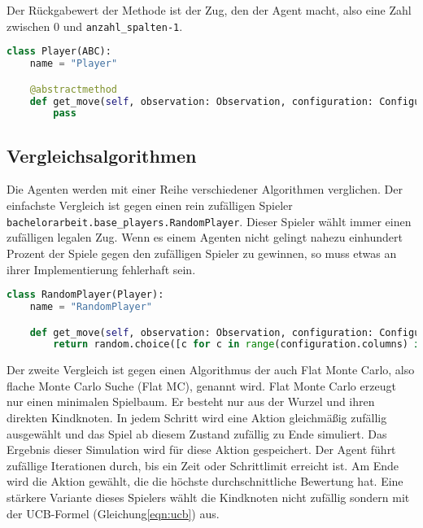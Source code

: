 Der Rückgabewert der Methode ist der Zug, den der Agent macht, also eine Zahl zwischen 0 und \verb|anzahl_spalten-1|.

\begin{lstlisting}[language=Python,caption=Die Basisklasse aller Agenten.,label={lst:baseplayer}]
class Player(ABC):
    name = "Player"

    @abstractmethod
    def get_move(self, observation: Observation, configuration: Configuration) -> int:
        pass
\end{lstlisting}

\subsection{Vergleichsalgorithmen}
\label{chap:vergleiche-impl}

Die Agenten werden mit einer Reihe verschiedener Algorithmen verglichen.
Der einfachste Vergleich ist gegen einen rein zufälligen Spieler \verb|bachelorarbeit.base_players.RandomPlayer|.
Dieser Spieler wählt immer einen zufälligen legalen Zug.
Wenn es einem Agenten nicht gelingt nahezu einhundert Prozent der Spiele gegen den zufälligen Spieler zu gewinnen, so muss etwas an ihrer Implementierung fehlerhaft sein.

\begin{lstlisting}[language=Python,caption=Ein Spieler der zufällige Züge wählt.,label={lst:randomplayer}]
class RandomPlayer(Player):
    name = "RandomPlayer"

    def get_move(self, observation: Observation, configuration: Configuration) -> int:
        return random.choice([c for c in range(configuration.columns) if observation.board[c] == 0])
\end{lstlisting}

Der zweite Vergleich ist gegen einen Algorithmus der auch Flat Monte Carlo, also flache Monte Carlo Suche (Flat MC), genannt wird.
Flat Monte Carlo erzeugt nur einen minimalen Spielbaum.
Er besteht nur aus der Wurzel und ihren direkten Kindknoten.
In jedem Schritt wird eine Aktion gleichmäßig zufällig ausgewählt und das Spiel ab diesem Zustand zufällig zu Ende simuliert.
Das Ergebnis dieser Simulation wird für diese Aktion gespeichert.
Der Agent führt zufällige Iterationen durch, bis ein Zeit oder Schrittlimit erreicht ist.
Am Ende wird die Aktion gewählt, die die höchste durchschnittliche Bewertung hat.
Eine stärkere Variante dieses Spielers wählt die Kindknoten nicht zufällig sondern mit der UCB-Formel (Gleichung\~\ref{eqn:ucb}) aus.

